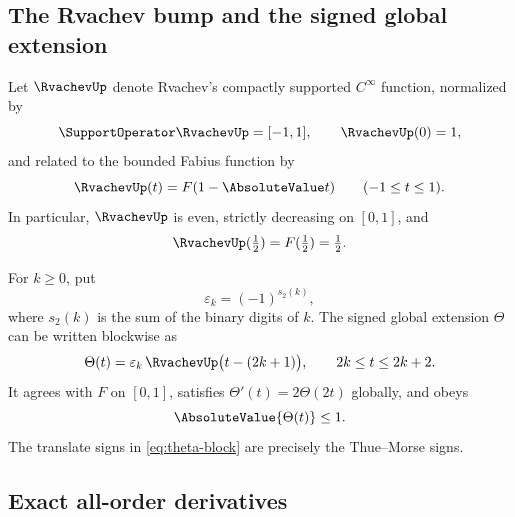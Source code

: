 \documentclass[11pt,oneside]{article}
\theoremstyle{definition}
\theoremstyle{remark}
\newcommand{\eps}{\varepsilon}
\newcommand{\ThetaF}{\Theta}
\newcommand{\half}{\tfrac12}
\begin{document}
\subsection{The Rvachev bump and the signed global extension}

Let $\RvachevUp$ denote Rvachev's compactly supported $C^\infty$ function, normalized by
\[
 \SupportOperator\RvachevUp=[-1,1],\qquad \RvachevUp(0)=1,
\]
and related to the bounded Fabius function by
\begin{equation}
 \RvachevUp(t)=F(1-\AbsoluteValue t)\qquad(-1\leq t\leq1).
 \label{eq:up-F}
\end{equation}
In particular, $\RvachevUp$ is even, strictly decreasing on $[0,1]$, and
\begin{equation}
 \RvachevUp(\half)=F(\half)=\half.
 \label{eq:up-half}
\end{equation}

For $k\geq0$, put
\begin{equation}
  \eps_k=(-1)^{s_2(k)},
  \label{eq:tm-sign}
\end{equation}
where $s_2(k)$ is the sum of the binary digits of $k$.  The signed global extension
$\ThetaF$ can be written blockwise as
\begin{equation}
 \ThetaF(t)=\eps_k\,\RvachevUp\bigl(t-(2k+1)\bigr),
 \qquad 2k\leq t\leq2k+2.
 \label{eq:theta-block}
\end{equation}
It agrees with $F$ on $[0,1]$, satisfies $\ThetaF'(t)=2\ThetaF(2t)$ globally, and obeys
\begin{equation}
 \AbsoluteValue{\ThetaF(t)}\leq1.
 \label{eq:theta-bound}
\end{equation}
The translate signs in \eqref{eq:theta-block} are precisely the Thue--Morse signs.

\subsection{Exact all-order derivatives}
\end{document}

